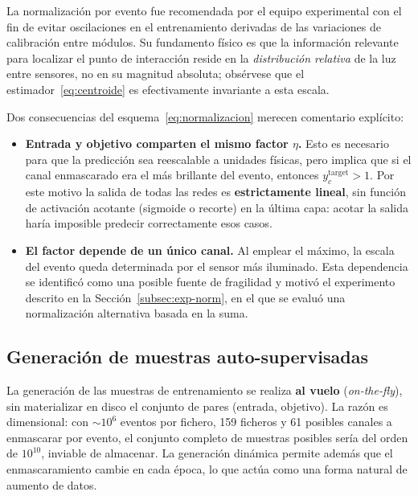 La normalización por evento fue recomendada por el equipo experimental con el fin de evitar
oscilaciones en el entrenamiento derivadas de las variaciones de calibración entre módulos. Su
fundamento físico es que la información relevante para localizar el punto de interacción reside en
la \emph{distribución relativa} de la luz entre sensores, no en su magnitud absoluta; obsérvese que
el estimador~\eqref{eq:centroide} es efectivamente invariante a esta escala.

Dos consecuencias del esquema~\eqref{eq:normalizacion} merecen comentario explícito:

\begin{itemize}
    \item \textbf{Entrada y objetivo comparten el mismo factor $\eta$.} Esto es necesario para que
    la predicción sea reescalable a unidades físicas, pero implica que si el canal enmascarado era el
    más brillante del evento, entonces $y^{\text{target}}_c > 1$. Por este motivo la salida de todas
    las redes es \textbf{estrictamente lineal}, sin función de activación acotante (sigmoide o
    recorte) en la última capa: acotar la salida haría imposible predecir correctamente esos casos.

    \item \textbf{El factor depende de un único canal.} Al emplear el máximo, la escala del evento
    queda determinada por el sensor más iluminado. Esta dependencia se identificó como una posible
    fuente de fragilidad y motivó el experimento descrito en la Sección~\ref{subsec:exp-norm}, en el
    que se evaluó una normalización alternativa basada en la suma.
\end{itemize}

\subsection{Generación de muestras auto-supervisadas}
\label{subsec:generacion-muestras}

La generación de las muestras de entrenamiento se realiza \textbf{al vuelo} (\emph{on-the-fly}),
sin materializar en disco el conjunto de pares (entrada, objetivo). La razón es dimensional: con
$\sim 10^6$ eventos por fichero, 159 ficheros y 61 posibles canales a enmascarar por evento, el
conjunto completo de muestras posibles sería del orden de $10^{10}$, inviable de almacenar. La
generación dinámica permite además que el enmascaramiento cambie en cada época, lo que actúa como
una forma natural de aumento de datos.

